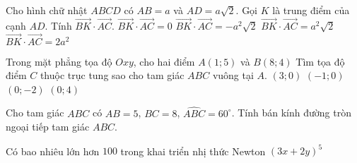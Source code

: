 \begin{ex}
	Cho hình chữ nhật $ABCD$ có $AB=a$ và $AD=a\sqrt{2}$. Gọi $K$ là trung điểm của cạnh $AD$. Tính $\vec{BK} \cdot \vec{AC}$.
	\choice
	{$\vec{BK} \cdot \vec{AC}=0$}
	{$\vec{BK} \cdot \vec{AC}=-a^2\sqrt{2}$}
	{$\vec{BK} \cdot \vec{AC}=a^2\sqrt{2}$}
	{$\vec{BK} \cdot \vec{AC}=2a^2$}
\end{ex}
\begin{ex}%
	Trong mặt phẳng tọa độ $Oxy$, cho hai điểm $A(1;5)$ và $B(8;4)$ Tìm tọa độ điểm $C$ thuộc trục tung sao cho tam giác $ABC$ vuông tại $A$.
	\choice
	{$(3;0)$}
	{$(-1;0)$}
	{\True $\left(0;- 2 \right)$}
	{$(0;4)$}
\end{ex}

\begin{ex}%
	Cho tam giác $ABC$ có $AB=5$, $BC=8$, $\widehat{ABC}=60^{\circ}$. Tính  bán kính đường tròn ngoại tiếp tam giác $ABC$.
\end{ex}
\begin{ex}
	Có bao nhiêu lớn hơn $100$ trong khai triển nhị thức Newton $(3x+2y)^5$
\end{ex}

